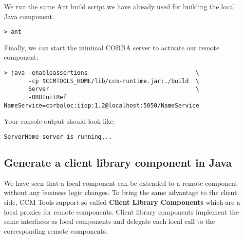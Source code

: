 We run the same Ant build script we have already used for building the
local Java component. 
\begin{footnotesize}
\begin{verbatim}
> ant
\end{verbatim}
\end{footnotesize}

Finally, we can start the minimal CORBA server to activate our remote component:
\begin{footnotesize}
\begin{verbatim}
> java -enableassertions                               \
       -cp $CCMTOOLS_HOME/lib/ccm-runtime.jar:./build  \
       Server                                          \
       -ORBInitRef NameService=corbaloc:iiop:1.2@localhost:5050/NameService
\end{verbatim}
\end{footnotesize}

Your console output should look like:
\begin{footnotesize}
\begin{verbatim}
ServerHome server is running...
\end{verbatim}
\end{footnotesize}


\subsection{Generate a client library component in Java}
\label{subsection:GenerateClientLibComponentInJava}

We have seen that a local component can be extended to a remote component
without any business logic changes.
To bring the same advantage to the client side, CCM Tools support so called
{\bf Client Library Components} which are a local proxies for remote components.
Client library components implement the same interfaces as local components and
delegate each local call to the corresponding remote components.
 
